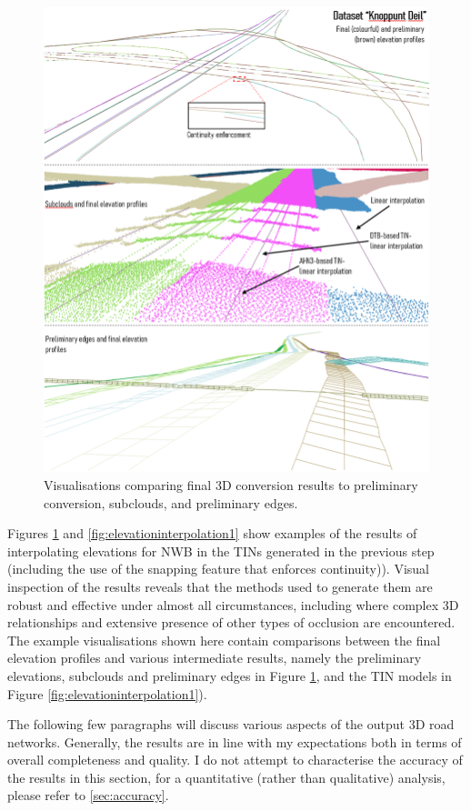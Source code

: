 \begin{figure}
    \centering
    \includegraphics[width=0.9\linewidth]{final_report/figs/elevationinterpolation0.png}
    \caption{Visualisations comparing final 3D conversion results to preliminary conversion, subclouds, and preliminary edges.}
    \label{fig:elevationinterpolation0}
\end{figure}

Figures \ref{fig:elevationinterpolation0} and \ref{fig:elevationinterpolation1} show examples of the results of interpolating elevations for NWB in the TINs generated in the previous step (including the use of the snapping feature that enforces continuity)). Visual inspection of the results reveals that the methods used to generate them are robust and effective under almost all circumstances, including where complex 3D relationships and extensive presence of other types of occlusion are encountered. The example visualisations shown here contain comparisons between the final elevation profiles and various intermediate results, namely the preliminary elevations, subclouds and preliminary edges in Figure \ref{fig:elevationinterpolation0}, and the TIN models in Figure \ref{fig:elevationinterpolation1}).

The following few paragraphs will discuss various aspects of the output 3D road networks. Generally, the results are in line with my expectations both in terms of overall completeness and quality. I do not attempt to characterise the accuracy of the results in this section, for a quantitative (rather than qualitative) analysis, please refer to \ref{sec:accuracy}.

